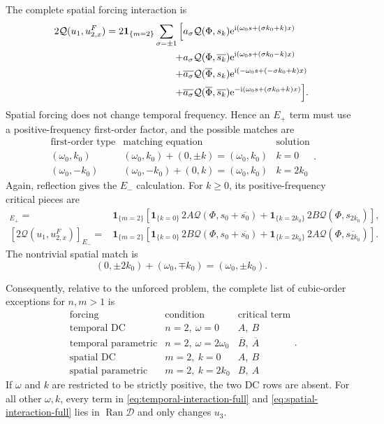 \documentclass[11pt]{article}
\newcommand{\ii}{\mathrm{i}}
\newcommand{\ee}{\mathrm{e}}
\newcommand{\cQ}{\mathcal{Q}}
\newcommand{\cD}{\mathcal{D}}
\newcommand{\one}[1]{\bm{1}_{\{#1\}}}
\begin{document}
The complete spatial forcing interaction is
\begin{align}
 2\cQ(u_1,u_{2,x}^F)=2\one{m=2}\sum_{\sigma=\pm1}\Big[{}
 &a_\sigma\cQ(\Phi,s_k)
 \ee^{\ii(\omega_0s+(\sigma k_0+k)x)}
 \notag\\
 +{}&a_\sigma\cQ(\Phi,\overline{s_k})
 \ee^{\ii(\omega_0s+(\sigma k_0-k)x)}
 \notag\\
 +{}&\overline{a_\sigma}\cQ(\overline\Phi,s_k)
 \ee^{\ii(-\omega_0s+(-\sigma k_0+k)x)}
 \notag\\
 +{}&\overline{a_\sigma}\cQ(\overline\Phi,\overline{s_k})
 \ee^{-\ii(\omega_0s+(\sigma k_0+k)x)}
 \Big].
 \label{eq:spatial-interaction-full}
\end{align}
Spatial forcing does not change temporal frequency.  Hence an $E_+$ term
must use a positive-frequency first-order factor, and the possible matches
are
\begin{equation}
 \begin{array}{c|c|c}
 \text{first-order type}&\text{matching equation}&\text{solution}\\ \hline
 (\omega_0,k_0)&(\omega_0,k_0)+(0,\pm k)
 =(\omega_0,k_0)&k=0\\
 (\omega_0,-k_0)&(\omega_0,-k_0)+(0,k)
 =(\omega_0,k_0)&k=2k_0
 \end{array}.
 \label{eq:spatial-selection-logic}
\end{equation}
Again, reflection gives the $E_-$ calculation.
For $k\ge0$, its positive-frequency critical pieces are
\begin{align}
 [2\cQ(u_1,u_{2,x}^F)]_{E_+}
 ={}&\one{m=2}\left[
 \one{k=0}\,2A\cQ(\Phi,s_0+\overline{s_0})
 +\one{k=2k_0}\,2B\cQ(\Phi,s_{2k_0})\right],
 \label{eq:spatial-critical-A}\\
 [2\cQ(u_1,u_{2,x}^F)]_{E_-}
 ={}&\one{m=2}\left[
 \one{k=0}\,2B\cQ(\Phi,s_0+\overline{s_0})
 +\one{k=2k_0}\,2A\cQ(\Phi,\overline{s_{2k_0}})\right].
 \label{eq:spatial-critical-B}
\end{align}
The nontrivial spatial match is
\begin{equation}
 \boxed{
 (0,\pm2k_0)+(\omega_0,\mp k_0)
 =(\omega_0,\pm k_0).}
 \label{eq:spatial-wave-match}
\end{equation}

Consequently, relative to the unforced problem, the complete list of
cubic-order exceptions for $n,m>1$ is
\begin{equation}
 \begin{array}{c|c|c}
 \text{forcing}&\text{condition}&\text{critical term}\\ \hline
 \text{temporal DC}&n=2,\ \omega=0&A,\ B\\
 \text{temporal parametric}&n=2,\ \omega=2\omega_0&\overline B,\ \overline A\\
 \text{spatial DC}&m=2,\ k=0&A,\ B\\
 \text{spatial parametric}&m=2,\ k=2k_0&B,\ A
 \end{array}.
 \label{eq:forcing-case-table}
\end{equation}
If $\omega$ and $k$ are restricted to be strictly positive, the two DC rows
are absent.
For all other $\omega,k$, every term in
\eqref{eq:temporal-interaction-full} and
\eqref{eq:spatial-interaction-full} lies in $\operatorname{Ran}\cD$ and only
changes $u_3$.
\end{document}
